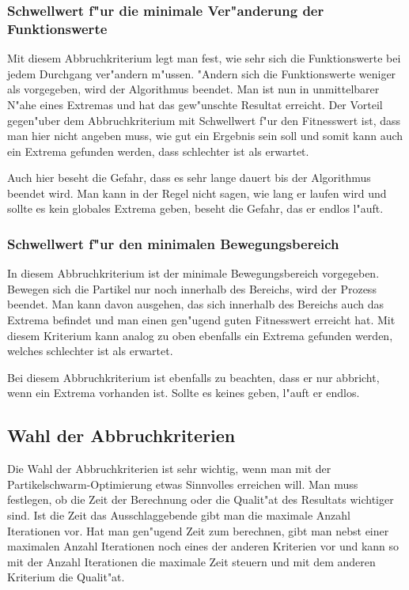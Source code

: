 \subsubsection{Schwellwert f"ur die minimale Ver"anderung der Funktionswerte}
Mit diesem Abbruchkriterium legt man fest, wie sehr sich die
Funktionswerte bei jedem Durchgang ver"andern m"ussen. "Andern sich die
Funktionswerte weniger als vorgegeben, wird der Algorithmus beendet. Man
ist nun in unmittelbarer N"ahe eines Extremas und hat das gew"unschte
Resultat erreicht. Der Vorteil gegen"uber dem Abbruchkriterium mit
Schwellwert f"ur den Fitnesswert ist, dass man hier nicht angeben muss,
wie gut ein Ergebnis sein soll und somit kann auch ein Extrema gefunden
werden, dass schlechter ist als erwartet. 

Auch hier beseht die Gefahr, dass es sehr lange dauert bis der Algorithmus
beendet wird. Man kann in der Regel nicht sagen, wie lang er laufen
wird und sollte es kein globales Extrema geben, beseht die Gefahr,
das er endlos l"auft.

\subsubsection{Schwellwert f"ur den minimalen Bewegungsbereich}
In diesem Abbruchkriterium ist der minimale Bewegungsbereich
vorgegeben. Bewegen sich die Partikel nur noch innerhalb des Bereichs,
wird der Prozess beendet. Man kann davon ausgehen, das sich innerhalb
des Bereichs auch das Extrema befindet und man einen gen"ugend guten
Fitnesswert erreicht hat. Mit diesem Kriterium kann analog zu oben
ebenfalls ein Extrema gefunden werden, welches schlechter ist als
erwartet.

Bei diesem Abbruchkriterium ist ebenfalls zu beachten, dass er nur
abbricht, wenn ein Extrema vorhanden ist. Sollte es keines geben, l"auft
er endlos.

\subsection{Wahl der Abbruchkriterien}
Die Wahl der Abbruchkriterien ist sehr wichtig, wenn man mit der
Partikelschwarm-Optimierung etwas Sinnvolles erreichen will. Man muss
festlegen, ob die Zeit der Berechnung oder die Qualit"at des Resultats
wichtiger sind. Ist die Zeit das Ausschlaggebende gibt man die maximale
Anzahl Iterationen vor. Hat man gen"ugend Zeit zum berechnen, gibt
man nebst einer maximalen Anzahl Iterationen noch eines der anderen
Kriterien vor und kann so mit der Anzahl Iterationen die maximale Zeit
steuern und mit dem anderen Kriterium die Qualit"at.

